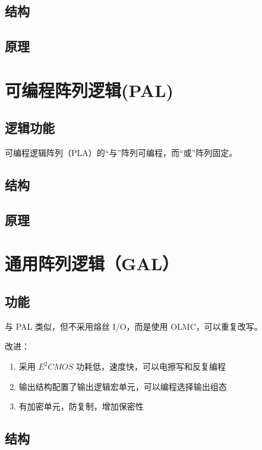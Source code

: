 \subsection{结构}

\subsection{原理}


\newpage
\section{可编程阵列逻辑(PAL)}

\subsection{逻辑功能}

可编程逻辑阵列（PLA）的“与”阵列可编程，而“或”阵列固定。

\subsection{结构}

\subsection{原理}


\newpage
\section{通用阵列逻辑（GAL）}

\subsection{功能}

与 PAL 类似，但不采用熔丝 I/O，而是使用 OLMC，可以重复改写。

改进：
\begin{enumerate}
    \item 采用 $E^2CMOS$ 功耗低，速度快，可以电擦写和反复编程
    \item 输出结构配置了输出逻辑宏单元，可以编程选择输出组态
    \item 有加密单元，防复制，增加保密性
\end{enumerate}

\subsection{结构}

